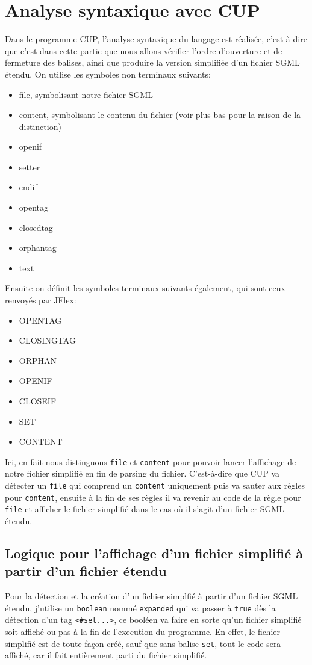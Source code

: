 \documentclass[a4paper]{article}
\begin{document}
\section{Analyse syntaxique avec CUP}
Dans le programme CUP, l'analyse syntaxique du langage est réalisée, c'est-à-dire que c'est dans cette partie que nous allons vérifier l'ordre d'ouverture et de fermeture des balises, ainsi que produire la version simplifiée d'un fichier SGML étendu.
On utilise les symboles non terminaux suivants: \\
\begin{itemize}
	\item file, symbolisant notre fichier SGML
	\item content, symbolisant le contenu du fichier (voir plus bas pour la raison de la distinction)
	\item openif
	\item setter
	\item endif
	\item opentag
	\item closedtag
	\item orphantag
	\item text \\
\end{itemize}
Ensuite on définit les symboles terminaux suivants également, qui sont ceux renvoyés par JFlex: \\
\begin{itemize}
	\item OPENTAG
	\item CLOSINGTAG
	\item ORPHAN
	\item OPENIF
	\item CLOSEIF
	\item SET
	\item CONTENT \\
\end{itemize}

Ici, en fait nous distinguons \verb+file+ et \verb+content+ pour pouvoir lancer l'affichage de notre fichier simplifié en fin de parsing du fichier. C'est-à-dire que CUP va détecter un \verb+file+ qui comprend un \verb+content+ uniquement puis va sauter aux règles pour \verb+content+, ensuite à la fin de ses règles il va revenir au code de la règle pour \verb+file+ et afficher le fichier simplifié dans le cas où il s'agit d'un fichier SGML étendu.

\subsection{Logique pour l'affichage d'un fichier simplifié à partir d'un fichier étendu}
Pour la détection et la création d'un fichier simplfié à partir d'un fichier SGML étendu, j'utilise un \verb`boolean` nommé \verb`expanded` qui va passer à \verb+true+ dès la détection d'un tag \verb+<#set...>+, ce booléen va faire en sorte qu'un fichier simplifié soit affiché ou pas à la fin de l'execution du programme. En effet, le fichier simplifié est de toute façon créé, sauf que sans balise \verb+set+, tout le code sera affiché, car il fait entièrement parti du fichier simplifié. \\
\end{document}
